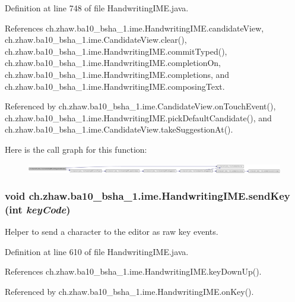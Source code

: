 Definition at line 748 of file HandwritingIME.java.

References ch.zhaw.ba10\_\-bsha\_\-1.ime.HandwritingIME.candidateView, ch.zhaw.ba10\_\-bsha\_\-1.ime.CandidateView.clear(), ch.zhaw.ba10\_\-bsha\_\-1.ime.HandwritingIME.commitTyped(), ch.zhaw.ba10\_\-bsha\_\-1.ime.HandwritingIME.completionOn, ch.zhaw.ba10\_\-bsha\_\-1.ime.HandwritingIME.completions, and ch.zhaw.ba10\_\-bsha\_\-1.ime.HandwritingIME.composingText.

Referenced by ch.zhaw.ba10\_\-bsha\_\-1.ime.CandidateView.onTouchEvent(), ch.zhaw.ba10\_\-bsha\_\-1.ime.HandwritingIME.pickDefaultCandidate(), and ch.zhaw.ba10\_\-bsha\_\-1.ime.CandidateView.takeSuggestionAt().

Here is the call graph for this function:\nopagebreak
\begin{figure}[H]
\begin{center}
\leavevmode
\includegraphics[width=420pt]{classch_1_1zhaw_1_1ba10__bsha__1_1_1ime_1_1HandwritingIME_ada3cca347b6d9a39b3fb4d008d90dac8_cgraph}
\end{center}
\end{figure}
\hypertarget{classch_1_1zhaw_1_1ba10__bsha__1_1_1ime_1_1HandwritingIME_a2711e357f6251b532e7d0bde79cadfdf}{
\subsubsection[{sendKey}]{\setlength{\rightskip}{0pt plus 5cm}void ch.zhaw.ba10\_\-bsha\_\-1.ime.HandwritingIME.sendKey (int {\em keyCode})}}
\label{classch_1_1zhaw_1_1ba10__bsha__1_1_1ime_1_1HandwritingIME_a2711e357f6251b532e7d0bde79cadfdf}
Helper to send a character to the editor as raw key events. 

Definition at line 610 of file HandwritingIME.java.

References ch.zhaw.ba10\_\-bsha\_\-1.ime.HandwritingIME.keyDownUp().

Referenced by ch.zhaw.ba10\_\-bsha\_\-1.ime.HandwritingIME.onKey().

